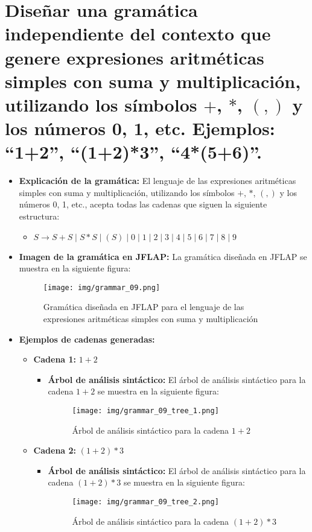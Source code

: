 \documentclass[11pt]{report}
\begin{document}
\section{Diseñar una gramática independiente del contexto que genere expresiones aritméticas simples con suma y multiplicación, utilizando los símbolos $+$, $*$, $(, )$ y los números 0, 1, etc. Ejemplos: “1+2”, “(1+2)*3”, “4*(5+6)”.}
\begin{itemize}
  \item \textbf{Explicación de la gramática:} El lenguaje de las expresiones aritméticas simples con suma y multiplicación, utilizando los símbolos $+$, $*$, $(, )$ y los números 0, 1, etc., acepta todas las cadenas que siguen la siguiente estructura:
  \begin{itemize}
    \item $S \rightarrow S + S \mid S * S \mid (S) \mid 0 \mid 1 \mid 2 \mid 3 \mid 4 \mid 5 \mid 6 \mid 7 \mid 8 \mid 9 $
  \end{itemize}
  \item \textbf{Imagen de la gramática en JFLAP:} La gramática diseñada en JFLAP se muestra en la siguiente figura:
  \begin{figure}[H]
    \centering
    \texttt{[image: img/grammar\_09.png]}
    \caption{Gramática diseñada en JFLAP para el lenguaje de las expresiones aritméticas simples con suma y multiplicación}
  \end{figure}

  \newpage

  \item \textbf{Ejemplos de cadenas generadas:}
  \begin{itemize}
    \item \textbf{Cadena 1:} $1+2$
    \begin{itemize}
      \item \textbf{Árbol de análisis sintáctico:} El árbol de análisis sintáctico para la cadena $1+2$ se muestra en la siguiente figura:
      \begin{figure}[H]
        \centering
        \texttt{[image: img/grammar\_09\_tree\_1.png]}
        \caption{Árbol de análisis sintáctico para la cadena $1+2$}
        \label{fig:arbol25}
      \end{figure}
    \end{itemize}

    \newpage

    \item \textbf{Cadena 2:} $(1+2)*3$
    \begin{itemize}
      \item \textbf{Árbol de análisis sintáctico:} El árbol de análisis sintáctico para la cadena $(1+2)*3$ se muestra en la siguiente figura:
      \begin{figure}[H]
        \centering
        \texttt{[image: img/grammar\_09\_tree\_2.png]}
        \caption{Árbol de análisis sintáctico para la cadena $(1+2)*3$}
        \label{fig:arbol26}
      \end{figure}
    \end{itemize}


\end{itemize}
\end{itemize}
\end{document}
